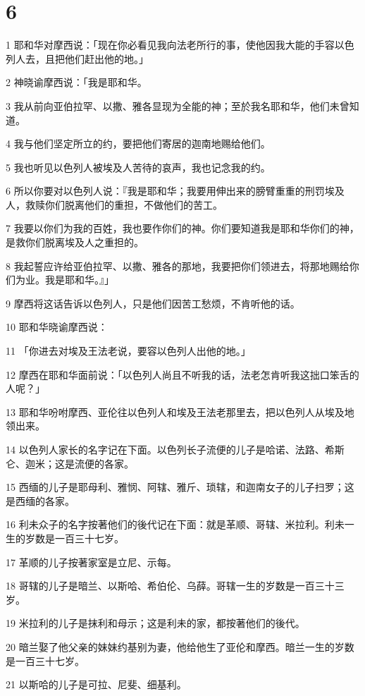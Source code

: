 \chapter{6}

\par 1 耶和华对摩西说：「现在你必看见我向法老所行的事，使他因我大能的手容以色列人去，且把他们赶出他的地。」
\par 2 神晓谕摩西说：「我是耶和华。
\par 3 我从前向亚伯拉罕、以撒、雅各显现为全能的神；至於我名耶和华，他们未曾知道。
\par 4 我与他们坚定所立的约，要把他们寄居的迦南地赐给他们。
\par 5 我也听见以色列人被埃及人苦待的哀声，我也记念我的约。
\par 6 所以你要对以色列人说：『我是耶和华；我要用伸出来的膀臂重重的刑罚埃及人，救赎你们脱离他们的重担，不做他们的苦工。
\par 7 我要以你们为我的百姓，我也要作你们的神。你们要知道我是耶和华你们的神，是救你们脱离埃及人之重担的。
\par 8 我起誓应许给亚伯拉罕、以撒、雅各的那地，我要把你们领进去，将那地赐给你们为业。我是耶和华。』」
\par 9 摩西将这话告诉以色列人，只是他们因苦工愁烦，不肯听他的话。
\par 10 耶和华晓谕摩西说：
\par 11 「你进去对埃及王法老说，要容以色列人出他的地。」
\par 12 摩西在耶和华面前说：「以色列人尚且不听我的话，法老怎肯听我这拙口笨舌的人呢？」
\par 13 耶和华吩咐摩西、亚伦往以色列人和埃及王法老那里去，把以色列人从埃及地领出来。
\par 14 以色列人家长的名字记在下面。以色列长子流便的儿子是哈诺、法路、希斯仑、迦米；这是流便的各家。
\par 15 西缅的儿子是耶母利、雅悯、阿辖、雅斤、琐辖，和迦南女子的儿子扫罗；这是西缅的各家。
\par 16 利未众子的名字按著他们的後代记在下面：就是革顺、哥辖、米拉利。利未一生的岁数是一百三十七岁。
\par 17 革顺的儿子按著家室是立尼、示每。
\par 18 哥辖的儿子是暗兰、以斯哈、希伯伦、乌薛。哥辖一生的岁数是一百三十三岁。
\par 19 米拉利的儿子是抹利和母示；这是利未的家，都按著他们的後代。
\par 20 暗兰娶了他父亲的妹妹约基别为妻，他给他生了亚伦和摩西。暗兰一生的岁数是一百三十七岁。
\par 21 以斯哈的儿子是可拉、尼斐、细基利。

